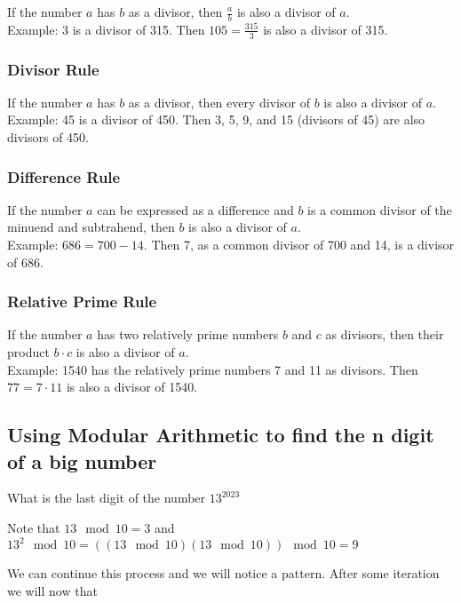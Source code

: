 If the number \( a \) has \( b \) as a divisor, then \( \frac{a}{b} \) is also a divisor of \( a \). \\
Example: 3 is a divisor of 315. Then \( 105 = \frac{315}{3} \) is also a divisor of 315.

\subsubsection*{Divisor Rule}

If the number \( a \) has \( b \) as a divisor, then every divisor of \( b \) is also a divisor of \( a \). \\
Example: 45 is a divisor of 450. Then 3, 5, 9, and 15 (divisors of 45) are also divisors of 450.

\subsubsection*{Difference Rule}

If the number \( a \) can be expressed as a difference and \( b \) is a common divisor of the minuend and subtrahend, then \( b \) is also a divisor of \( a \). \\
Example: \( 686 = 700 - 14 \). Then 7, as a common divisor of 700 and 14, is a divisor of 686.

\subsubsection*{Relative Prime Rule}

If the number \( a \) has two relatively prime numbers \( b \) and \( c \) as divisors, then their product \( b \cdot c \) is also a divisor of \( a \). \\
Example: 1540 has the relatively prime numbers 7 and 11 as divisors. Then \( 77 = 7 \cdot 11 \) is also a divisor of 1540.

\subsection{Using Modular Arithmetic to find the n digit of a big number}

What is the last digit of the number \(13^{2023}\)

Note that \(13 \mod 10 = 3\) and  \(13^2 \mod 10 =  ((13 \mod 10)  (13\mod 10)) \mod 10 = 9 \)

We can continue this process and we will notice a pattern. After some iteration we will now that

